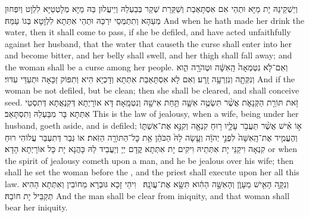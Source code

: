 {וְיַשְׁקֵינַהּ יָת מַיָּא וּתְהֵי אִם אִסְתָּאַבַת וְשַׁקַּרַת שְׁקַר בְּבַעְלַהּ וְיֵיעֲלוּן בַּהּ מַיָּא מְלָטְטַיָּא לִלְוָט וְיִפְּחוּן מְעַהָא וְתִתְמְסֵי יִרְכַּהּ וּתְהֵי אִתְּתָא לִלְוָטָא בְּגוֹ עַמַּהּ׃}
{And when he hath made her drink the water, then it shall come to pass, if she be defiled, and have acted unfaithfully against her husband, that the water that causeth the curse shall enter into her and become bitter, and her belly shall swell, and her thigh shall fall away; and the woman shall be a curse among her people.}{}
{וְאִם־לֹ֤א נִטְמְאָה֙ הָֽאִשָּׁ֔ה וּטְהֹרָ֖ה הִ֑וא וְנִקְּתָ֖ה וְנִזְרְעָ֥ה זָֽרַע׃
}
{וְאִם לָא אִסְתָּאַבַת אִתְּתָא וְדָכְיָא הִיא וְתִפּוֹק זַכָּאָה וּתְעַדֵּי עִדּוּי׃}
{And if the woman be not defiled, but be clean; then she shall be cleared, and shall conceive seed.}{}
{זֹ֥את תּוֹרַ֖ת הַקְּנָאֹ֑ת אֲשֶׁ֨ר תִּשְׂטֶ֥ה אִשָּׁ֛ה תַּ֥חַת אִישָׁ֖הּ וְנִטְמָֽאָה׃}
{דָּא אוֹרָיְתָא דְּקִנְאֲתָא דְּתִסְטֵי אִתְּתָא בָּר מִבַּעְלַהּ וְתִסְתָּאַב׃}
{This is the law of jealousy, when a wife, being under her husband, goeth aside, and is defiled;}{}
{א֣וֹ אִ֗ישׁ אֲשֶׁ֨ר תַּעֲבֹ֥ר עָלָ֛יו ר֥וּחַ קִנְאָ֖ה וְקִנֵּ֣א אֶת־אִשְׁתּ֑וֹ וְהֶעֱמִ֤יד אֶת־הָֽאִשָּׁה֙ לִפְנֵ֣י יְהֹוָ֔ה וְעָ֤שָׂה לָהּ֙ הַכֹּהֵ֔ן אֵ֥ת כׇּל־הַתּוֹרָ֖ה הַזֹּֽאת׃
}
{אוֹ גְּבַר דְּתִעְבַּר עֲלוֹהִי רוּחַ קִנְאָה וִיקַנֵּי יָת אִתְּתֵיהּ וִיקִים יָת אִתְּתָא קֳדָם יְיָ וְיַעֲבֵיד לַהּ כָּהֲנָא יָת כָּל אוֹרָיְתָא הָדָא׃}
{or when the spirit of jealousy cometh upon a man, and he be jealous over his wife; then shall he set the woman before the \lord, and the priest shall execute upon her all this law.}{}
{וְנִקָּ֥ה הָאִ֖ישׁ מֵעָוֺ֑ן וְהָאִשָּׁ֣ה הַהִ֔וא תִּשָּׂ֖א אֶת־עֲוֺנָֽהּ׃ \petucha 
{}}
{וִיהֵי זָכָא גּוּבְרָא מֵחוֹבִין וְאִתְּתָא הַהִיא תְּקַבֵּיל יָת חוֹבַהּ׃}
{And the man shall be clear from iniquity, and that woman shall bear her iniquity.}{}
\newperek
{}%
